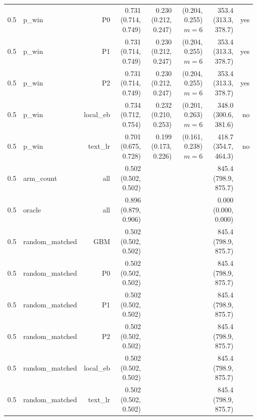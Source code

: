 \begin{tabular}{llrrrrrr}
0.5 & p\_win & P0 & 0.731 (0.714, 0.749) & 0.230 (0.212, 0.247) & (0.204, 0.255) $m=6$ & 353.4 (313.3, 378.7) & yes \\
0.5 & p\_win & P1 & 0.731 (0.714, 0.749) & 0.230 (0.212, 0.247) & (0.204, 0.255) $m=6$ & 353.4 (313.3, 378.7) & yes \\
0.5 & p\_win & P2 & 0.731 (0.714, 0.749) & 0.230 (0.212, 0.247) & (0.204, 0.255) $m=6$ & 353.4 (313.3, 378.7) & yes \\
0.5 & p\_win & local\_eb & 0.734 (0.712, 0.754) & 0.232 (0.210, 0.253) & (0.201, 0.263) $m=6$ & 348.0 (300.6, 381.6) & no \\
0.5 & p\_win & text\_lr & 0.701 (0.675, 0.728) & 0.199 (0.173, 0.226) & (0.161, 0.238) $m=6$ & 418.7 (354.7, 464.3) & no \\
0.5 & arm\_count & all & 0.502 (0.502, 0.502) &  &  & 845.4 (798.9, 875.7) &  \\
0.5 & oracle & all & 0.896 (0.879, 0.906) &  &  & 0.000 (0.000, 0.000) &  \\
0.5 & random\_matched & GBM & 0.502 (0.502, 0.502) &  &  & 845.4 (798.9, 875.7) &  \\
0.5 & random\_matched & P0 & 0.502 (0.502, 0.502) &  &  & 845.4 (798.9, 875.7) &  \\
0.5 & random\_matched & P1 & 0.502 (0.502, 0.502) &  &  & 845.4 (798.9, 875.7) &  \\
0.5 & random\_matched & P2 & 0.502 (0.502, 0.502) &  &  & 845.4 (798.9, 875.7) &  \\
0.5 & random\_matched & local\_eb & 0.502 (0.502, 0.502) &  &  & 845.4 (798.9, 875.7) &  \\
0.5 & random\_matched & text\_lr & 0.502 (0.502, 0.502) &  &  & 845.4 (798.9, 875.7) &  \\
\bottomrule
\end{tabular}
